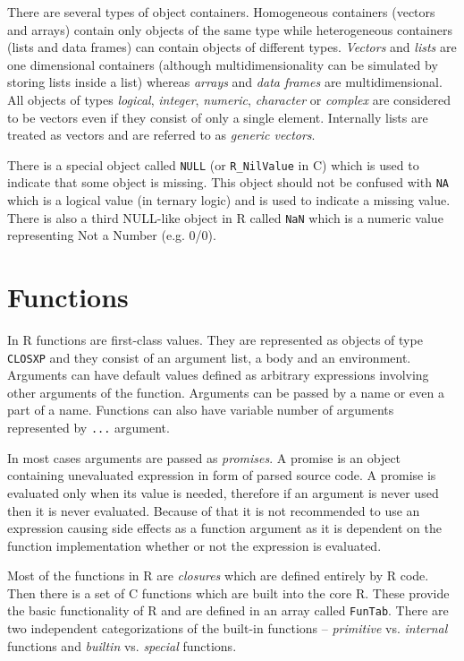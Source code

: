 \documentclass[thesis=M,english,hidelinks]{FITthesis}[2012/10/20]
\begin{document}
	There are several types of object containers. Homogeneous containers (vectors and arrays) contain only objects of the same type while heterogeneous containers (lists and data frames) can contain objects of different types. \emph{Vectors} and \emph{lists} are one dimensional containers (although multidimensionality can be simulated by storing lists inside a list) whereas \emph{arrays} and \emph{data frames} are multidimensional. All objects of types \emph{logical}, \emph{integer}, \emph{numeric}, \emph{character} or \emph{complex} are considered to be vectors even if they consist of only a single element. Internally lists are treated as vectors and are referred to as \emph{generic vectors}.\par
	
	There is a special object called \lstinline|NULL| (or \lstinline|R_NilValue| in C) which is used to indicate that some object is missing. This object should not be confused with \lstinline|NA| which is a logical value (in ternary logic) and is used to indicate a missing value. There is also a third NULL-like object in R called \lstinline{NaN} which is a numeric value representing Not a Number (e.g. 0/0).\par
	
	\section{Functions}
	In R functions are first-class values. They are represented as objects of type \lstinline|CLOSXP| and they consist of an argument list, a body and an environment. Arguments can have default values defined as arbitrary expressions involving other arguments of the function. Arguments can be passed by a name or even a part of a name. Functions can also have variable number of arguments represented by \lstinline|...| argument.\par
	
	In most cases arguments are passed as \emph{promises}. A promise is an object containing unevaluated expression in form of parsed source code. A promise is evaluated only when its value is needed, therefore if an argument is never used then it is never evaluated. Because of that it is not recommended to use an expression causing side effects as a function argument as it is dependent on the function implementation whether or not the expression is evaluated.\par
	
	Most of the functions in R are \emph{closures} which are defined entirely by R code. Then there is a set of C functions which are built into the core R. These provide the basic functionality of R and are defined in an array called \lstinline|FunTab|. There are two independent categorizations of the built-in functions -- \emph{primitive} vs. \emph{internal} functions and \emph{builtin} vs. \emph{special} functions.\par
	
\end{document}
